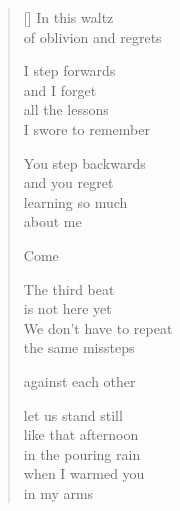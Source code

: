 \documentclass[12pt,a4paper]{article}
\begin{document}

\newpage

\poemtitle{}

\settowidth{\versewidth}{like that afternoon}

\bigskip

\begin{verse}[\versewidth]
  In this waltz \\
  of oblivion and regrets

  I step forwards \\
  and I forget \\
  all the lessons \\
  I swore to remember

  You step backwards \\
  and you regret \\
  learning so much \\
  about me

  Come

  The third beat \\
  is not here yet \\
  We don't have to repeat \\
  the same missteps

  against each other

  let us stand still \\
  like that afternoon \\
  in the pouring rain \\
  when I warmed you \\
  in my arms
\end{verse}
\end{document}
